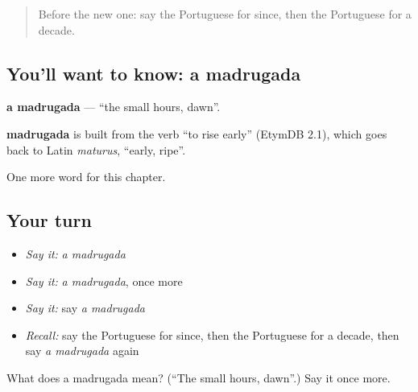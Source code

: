 \begin{quote}
Before the new one: say the Portuguese for since, then the Portuguese for a decade.
\end{quote}

\subsection*{You'll want to know: a madrugada}
\textbf{a madrugada} — \textquotedblleft{}the small hours, dawn\textquotedblright{}.

\begin{cousinweb}
\textbf{madrugada} is built from the verb \textquotedblleft{}to rise early\textquotedblright{} (EtymDB 2.1), which goes back to Latin \emph{maturus}, \textquotedblleft{}early, ripe\textquotedblright{}.
\end{cousinweb}

\begin{grammarlens}[title={What you've built}]
One more word for this chapter.
\end{grammarlens}

\subsection*{Your turn}
\begin{itemize}
\raggedright
  \item \emph{Say it:} \emph{a madrugada}
  \item \emph{Say it:} \emph{a madrugada}, once more
  \item \emph{Say it:} say \emph{a madrugada}
  \item \emph{Recall:} say the Portuguese for since, then the Portuguese for a decade, then say \emph{a madrugada} again
\end{itemize}

\begin{tcolorbox}[breakable,colback=teal!4,colframe=teal!35!black,title={Before you move on}]
What does a madrugada mean? (\textquotedblleft{}The small hours, dawn\textquotedblright{}.) Say it once more.
\end{tcolorbox}
